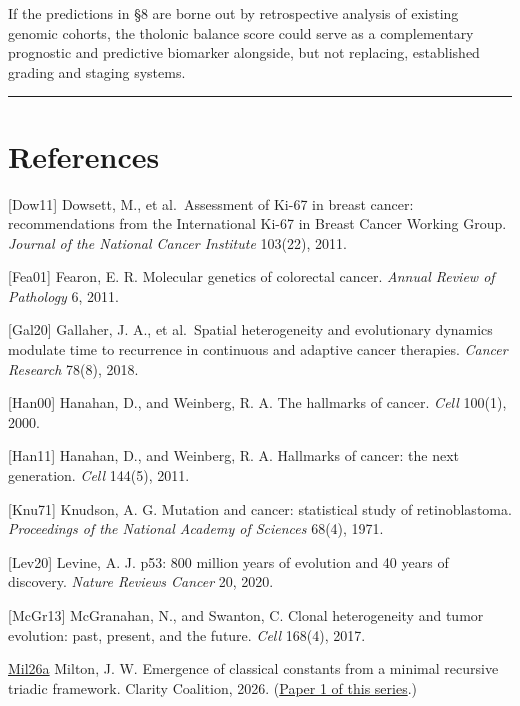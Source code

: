 \documentclass[12pt]{article}
\begin{document}
If the predictions in §8 are borne out by retrospective analysis of
existing genomic cohorts, the tholonic balance score could serve as a
complementary prognostic and predictive biomarker alongside, but not
replacing, established grading and staging systems.

\begin{center}\rule{0.5\linewidth}{0.5pt}\end{center}

\section{References}\label{references}

{[}Dow11{]} Dowsett, M., et al.~Assessment of Ki-67 in breast cancer:
recommendations from the International Ki-67 in Breast Cancer Working
Group. \emph{Journal of the National Cancer Institute} 103(22), 2011.

{[}Fea01{]} Fearon, E. R. Molecular genetics of colorectal cancer.
\emph{Annual Review of Pathology} 6, 2011.

{[}Gal20{]} Gallaher, J. A., et al.~Spatial heterogeneity and
evolutionary dynamics modulate time to recurrence in continuous and
adaptive cancer therapies. \emph{Cancer Research} 78(8), 2018.

{[}Han00{]} Hanahan, D., and Weinberg, R. A. The hallmarks of cancer.
\emph{Cell} 100(1), 2000.

{[}Han11{]} Hanahan, D., and Weinberg, R. A. Hallmarks of cancer: the
next generation. \emph{Cell} 144(5), 2011.

{[}Knu71{]} Knudson, A. G. Mutation and cancer: statistical study of
retinoblastoma. \emph{Proceedings of the National Academy of Sciences}
68(4), 1971.

{[}Lev20{]} Levine, A. J. p53: 800 million years of evolution and 40
years of discovery. \emph{Nature Reviews Cancer} 20, 2020.

{[}McGr13{]} McGranahan, N., and Swanton, C. Clonal heterogeneity and
tumor evolution: past, present, and the future. \emph{Cell} 168(4),
2017.

\href{https://github.com/baardev/truevalue/blob/main/docnav/Research/papers/1_recursive-tholonic-five-constants/1_recursive-tholonic-five-constants.pdf}{Mil26a}
Milton, J. W. Emergence of classical constants from a minimal recursive
triadic framework. Clarity Coalition, 2026.
(\href{https://github.com/baardev/truevalue/blob/main/docnav/Research/papers/1_recursive-tholonic-five-constants/1_recursive-tholonic-five-constants.pdf}{Paper
1 of this series}.)
\end{document}
